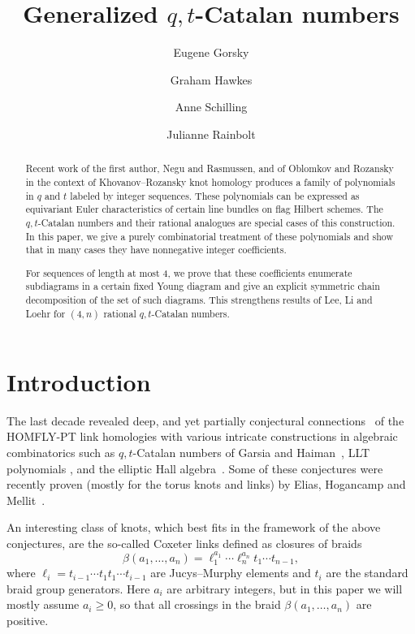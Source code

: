 \documentclass[11pt,reqno]{amsart}
\title{Generalized $q,t$-Catalan numbers}
\author[Gorsky]{Eugene Gorsky}
\author[Hawkes]{Graham Hawkes}
\author[Schilling]{Anne Schilling}
\author[Rainbolt]{Julianne Rainbolt}
\theoremstyle{definition}
\numberwithin{equation}{section}
\begin{document}
\begin{abstract}
Recent work of the first author, Negu and Rasmussen, and of Oblomkov and Rozansky in the context of
Khovanov--Rozansky knot homology produces a family of polynomials in $q$ and $t$ labeled by integer sequences. 
These polynomials can be expressed as equivariant Euler characteristics of certain line bundles on flag Hilbert schemes.
The $q,t$-Catalan numbers and their rational analogues are special cases of this construction. In this paper, we give a 
purely combinatorial treatment of these polynomials and show that in many cases they have nonnegative integer coefficients. 

For sequences of length at most 4, we prove that these coefficients enumerate subdiagrams in a certain fixed Young 
diagram and give an explicit symmetric chain decomposition of the set of such diagrams. This strengthens results of 
Lee, Li and Loehr for $(4,n)$ rational $q,t$-Catalan numbers.
\end{abstract}

\maketitle

\section{Introduction}

The last decade revealed deep, and yet partially conjectural 
connections~\cite{GORS.2014,GN.2015,GM.2013,GM.2014,GM.2016,GMV.2016,GMV.2017}
of the HOMFLY-PT link homologies with various intricate constructions in algebraic combinatorics such as $q,t$-Catalan 
numbers of Garsia and Haiman~\cite{GarsiaHaiman.1996}, LLT polynomials \cite{HHLRU.2005}, and the elliptic Hall 
algebra~\cite{SV.2013}. Some of these conjectures were recently proven (mostly for the torus knots and links) by Elias,
Hogancamp and Mellit~\cite{EH.2019,Hogancamp.2017,Mellit.2017}. 

An interesting class of knots, which best fits in the framework of the above conjectures, are the so-called Coxeter links 
defined as closures of braids 
\[
	\beta(a_1,\ldots,a_n)=\ell_1^{a_1}\cdots \ell_n^{a_n}t_1\cdots t_{n-1},
\]
where $\ell_i=t_{i-1}\cdots t_1t_1\cdots t_{i-1}$ are Jucys--Murphy elements and $t_i$ are the standard braid group 
generators. Here $a_i$ are arbitrary integers, but in this paper we will mostly assume $a_i\geqslant 0$, so that all crossings 
in the braid $\beta(a_1,\ldots,a_n)$ are positive.
 
\end{document}
